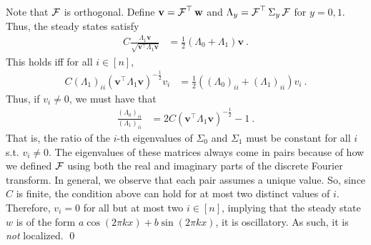 Note that $\operatorname{\mathcal{F}}$ is orthogonal.
Define $\mathbf{v} = \operatorname{\mathcal{F}}^\top \mathbf{w}$ and $\Lambda_y = \operatorname{\mathcal{F}}^\top \Sigma_y \operatorname{\mathcal{F}}$ for $y = 0,1$.
Thus, the steady states satisfy
\begin{align*}
  C \frac{\Lambda_1 \mathbf{v}}{\sqrt{\mathbf{v}^\top \Lambda_1 \mathbf{v}}} &= \frac{1}{2} \left( \Lambda_0 + \Lambda_1 \right) \mathbf{v}~.
\end{align*}
This holds iff for all $i \in [n]$,
\begin{align*}
  C (\Lambda_1)_{ii} (\mathbf{v}^\top \Lambda_1 \mathbf{v})^{-\frac{1}{2}} v_i &= \frac{1}{2} ( (\Lambda_0)_{ii} + (\Lambda_1)_{ii} ) v_i~.
\end{align*}
Thus, if $v_i \neq 0$, we must have that
\begin{align*}
  \frac{(\Lambda_0)_{ii}}{(\Lambda_1)_{ii}} &= 2 C (\mathbf{v}^\top \Lambda_1 \mathbf{v})^{-\frac{1}{2}} - 1~.
\end{align*}
That is, the ratio of the $i$-th eigenvalues of $\Sigma_0$ and $\Sigma_1$ must be constant for all $i$ s.t. $v_i \neq 0$.
The eigenvalues of these matrices always come in pairs because of how we defined $\operatorname{\mathcal{F}}$ using both the real and imaginary parts of the discrete Fourier transform.
In general, we observe that each pair assumes a unique value.
So, since $C$ is finite, the condition above can hold for at most two distinct values of $i$.
Therefore, $v_i = 0$ for all but at most two $i \in [n]$, implying that the steady state $w$ is of the form $a \cos(2\pi k x) + b \sin(2 \pi k x)$, \ie it is oscillatory.
As such, it is \emph{not} localized. 
\qed
